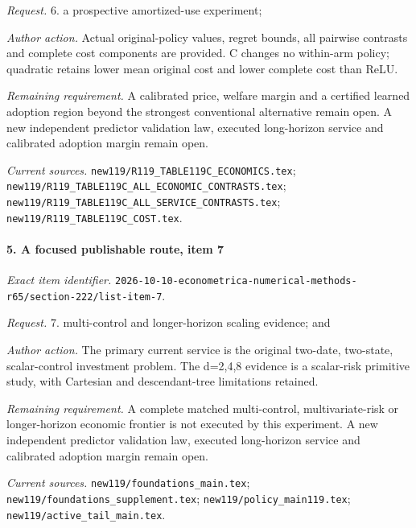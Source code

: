 \par\emph{Request.} 6. a prospective amortized-use experiment;

\par\emph{Author action.} Actual original-policy values, regret bounds, all pairwise contrasts and complete cost components are provided. C changes no within-arm policy; quadratic retains lower mean original cost and lower complete cost than ReLU.

\par\emph{Remaining requirement.} A calibrated price, welfare margin and a certified learned adoption region beyond the strongest conventional alternative remain open. A new independent predictor validation law, executed long-horizon service and calibrated adoption margin remain open.

\par\emph{Current sources.} \nolinkurl{new119/R119_TABLE119C_ECONOMICS.tex}; \nolinkurl{new119/R119_TABLE119C_ALL_ECONOMIC_CONTRASTS.tex}; \nolinkurl{new119/R119_TABLE119C_ALL_SERVICE_CONTRASTS.tex}; \nolinkurl{new119/R119_TABLE119C_COST.tex}.

\paragraph{5. A focused publishable route, item 7}

\emph{Exact item identifier.} \nolinkurl{2026-10-10-econometrica-numerical-methods-r65/section-222/list-item-7}.

\par\emph{Request.} 7. multi-control and longer-horizon scaling evidence; and

\par\emph{Author action.} The primary current service is the original two-date, two-state, scalar-control investment problem. The d=2,4,8 evidence is a scalar-risk primitive study, with Cartesian and descendant-tree limitations retained.

\par\emph{Remaining requirement.} A complete matched multi-control, multivariate-risk or longer-horizon economic frontier is not executed by this experiment. A new independent predictor validation law, executed long-horizon service and calibrated adoption margin remain open.

\par\emph{Current sources.} \nolinkurl{new119/foundations_main.tex}; \nolinkurl{new119/foundations_supplement.tex}; \nolinkurl{new119/policy_main119.tex}; \nolinkurl{new119/active_tail_main.tex}.

